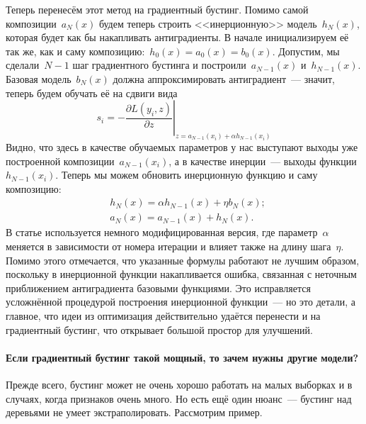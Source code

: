 \documentclass[12pt,fleqn]{article}
\begin{document}
Теперь перенесём этот метод на градиентный бустинг.
Помимо самой композиции~$a_{N}(x)$ будем теперь строить <<инерционную>> модель~$h_N(x)$,
которая будет как бы накапливать антиградиенты.
В начале инициализируем её так же, как и саму композицию:~$h_0(x) = a_0(x) = b_0(x)$.
Допустим, мы сделали~$N - 1$ шаг градиентного бустинга и построили~$a_{N - 1}(x)$ и~$h_{N - 1}(x)$.
Базовая модель~$b_N(x)$ должна аппроксимировать антиградиент~--- значит, теперь будем обучать её
на сдвиги вида
\[
    s_i
    =
    -
    \left.
    \frac{\partial L(y_i, z)}{\partial z}
    \right|_{z = a_{N - 1}(x_i) + \alpha h_{N - 1}(x_i)}
\]
Видно, что здесь в качестве обучаемых параметров у нас выступают выходы уже построенной композиции~$a_{N - 1}(x_i)$,
а в качестве инерции~--- выходы функции~$h_{N - 1}(x_i)$.
Теперь мы можем обновить инерционную функцию и саму композицию:
\begin{align*}
    &h_N(x)
    =
    \alpha h_{N - 1}(x)
    +
    \eta
    b_N(x);\\
    &a_N(x)
    =
    a_{N - 1}(x)
    +
    h_N(x).
\end{align*}
В статье используется немного модифицированная версия, где параметр~$\alpha$
меняется в зависимости от номера итерации и влияет также на длину шага~$\eta$.
Помимо этого отмечается, что указанные формулы работают не лучшим образом,
поскольку в инерционной функции накапливается ошибка, связанная с неточным
приближением антиградиента базовыми функциями.
Это исправляется усложнённой процедурой построения инерционной функции~---
но это детали, а главное, что идеи из оптимизация действительно удаётся
перенести и на градиентный бустинг, что открывает большой простор для улучшений.

\paragraph{Если градиентный бустинг такой мощный, то зачем нужны другие модели?}
Прежде всего, бустинг может не очень хорошо работать на малых выборках и в случаях,
когда признаков очень много.
Но есть ещё один нюанс~--- бустинг над деревьями не умеет экстраполировать.
Рассмотрим пример.
\end{document}
